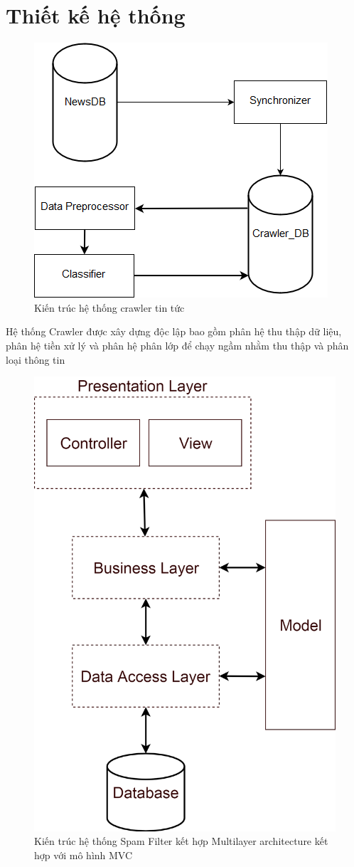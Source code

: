 \section{Thiết kế hệ thống} 
	\begin{figure}[H]
		\centering
		\includegraphics[width=0.5\linewidth]{Chapter3/Chapter3Figs/CrawlerSystem}
		\caption{Kiến trúc hệ thống crawler tin tức}
		\label{fig:crawlersystem}
	\end{figure}
Hệ thống Crawler được xây dựng độc lập bao gồm phân hệ thu thập dữ liệu, phân hệ tiền xử lý và phân hệ phân lớp để chạy ngầm nhằm thu thập và phân loại thông tin
	\begin{figure}[H]
		\centering
		\includegraphics[width=0.5\linewidth]{Chapter3/Chapter3Figs/Layers}
		\caption{Kiến trúc hệ thống Spam Filter kết hợp Multilayer architecture kết hợp với mô hình MVC}
		\label{fig:layers}
	\end{figure}
